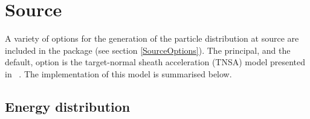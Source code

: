 \graphicspath{ {05-Source/Figures/} }

\section{Source}

A variety of options for the generation of the particle distribution
at source are included in the package (see section \ref{SourceOptions}).
The principal, and the default, option is the target-normal sheath
acceleration (TNSA) model presented in~\cite{10.1038/nphys199} .
The implementation of this model is summarised below.

\subsection{Energy distribution}


